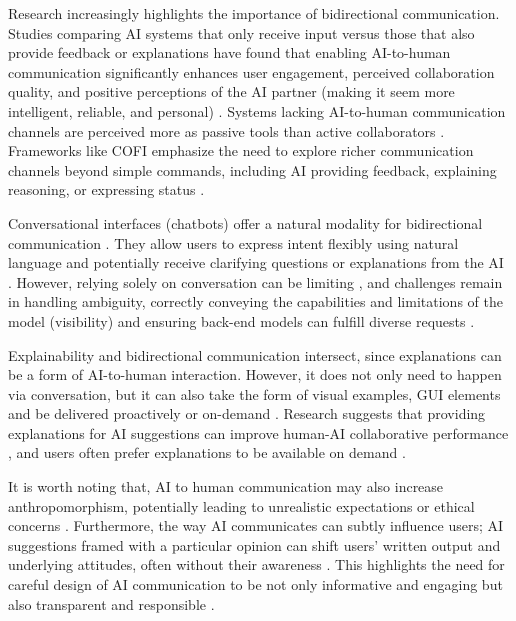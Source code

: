 Research increasingly highlights the importance of bidirectional communication. Studies comparing AI systems that only receive input versus those that also provide feedback or explanations have found that enabling AI-to-human communication significantly enhances user engagement, perceived collaboration quality, and positive perceptions of the AI partner (making it seem more intelligent, reliable, and personal) \cite{Rezwana2023-gj, Rezwana2022-ui}. Systems lacking AI-to-human communication channels are perceived more as passive tools than active collaborators \cite{Rezwana2023-gj}. Frameworks like COFI emphasize the need to explore richer communication channels beyond simple commands, including AI providing feedback, explaining reasoning, or expressing status \cite{Rezwana2022-gg}.

Conversational interfaces (chatbots) offer a natural modality for bidirectional communication \cite{Coenen2021-ym, Zhang2021-ej}. They allow users to express intent flexibly using natural language and potentially receive clarifying questions or explanations from the AI \cite{Coenen2021-ym}. However, relying solely on conversation can be limiting \cite{Tholander2023-rv}, and challenges remain in handling ambiguity, correctly conveying the capabilities and limitations of the model (visibility) and ensuring back-end models can fulfill diverse requests \cite{Zhang2021-ej}.

Explainability and bidirectional communication intersect, since explanations can be a form of AI-to-human interaction. However, it does not only need to happen via conversation, but it can also take the form of visual examples, GUI elements and be delivered proactively or on-demand \cite{Zhu2018-zd}. Research suggests that providing explanations for AI suggestions can improve human-AI collaborative performance \cite{Vaccaro2024-ne}, and users often prefer explanations to be available on demand \cite{Oh2018-mu}.

It is worth noting that, AI to human communication may also increase anthropomorphism, potentially leading to unrealistic expectations or ethical concerns \cite{Rezwana2023-gj, Rezwana2022-ui}. Furthermore, the way AI communicates can subtly influence users; AI suggestions framed with a particular opinion can shift users' written output and underlying attitudes, often without their awareness \cite{Jakesch2023-ks}. This highlights the need for careful design of AI communication to be not only informative and engaging but also transparent and responsible \cite{Jakesch2023-ks, El-Assady2022-qc}.

